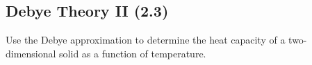\begin{enumerate}[label=(\alph*)]

    

    
    

    




    
\end{enumerate}

\subsection{Debye Theory II (2.3)}

Use the Debye approximation to determine the heat capacity of a two-dimensional solid as a function of temperature.


